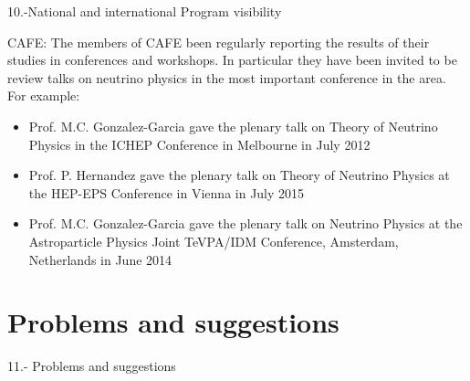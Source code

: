 \documentclass[a4paper,11pt,oneside]{article}
\begin{document}
10.-National and international Program visibility

CAFE: The members of CAFE been regularly reporting the results of their 
studies in  conferences and workshops. In particular they have been invited to
be review talks on neutrino physics in the most important conference
in the area. For example:
\begin{itemize}
\item Prof. M.C. Gonzalez-Garcia gave the plenary talk on Theory of Neutrino
Physics in the ICHEP Conference in Melbourne in July 2012
\item Prof. P. Hernandez gave the plenary talk on Theory of Neutrino Physics
at the HEP-EPS Conference in Vienna in July 2015 
\item Prof. M.C. Gonzalez-Garcia gave the plenary talk on Neutrino Physics
at the  Astroparticle Physics Joint  TeVPA/IDM Conference, Amsterdam, 
Netherlands in June 2014
\end{itemize}


\section{\bf \textsf{Problems and suggestions}}

11.- Problems and suggestions
%



\end{document}
